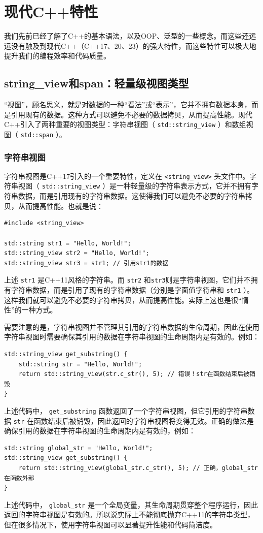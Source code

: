 \chapter{现代C++特性}

我们先前已经了解了C++的基本语法，以及OOP、泛型的一些概念。而这些还远远没有触及到现代C++（C++17、20、23）的强大特性，而这些特性可以极大地提升我们的编程效率和代码质量。

\section{string\_view和span：轻量级视图类型}

“视图”，顾名思义，就是对数据的一种“看法”或“表示”，它并不拥有数据本身，而是引用现有的数据。这种方式可以避免不必要的数据拷贝，从而提高性能。现代C++引入了两种重要的视图类型：字符串视图（ \verb|std::string_view| ）和数组视图（ \verb|std::span| ）。

\subsection{字符串视图}

字符串视图是C++17引入的一个重要特性，定义在 \verb|<string_view>| 头文件中。字符串视图（ \verb|std::string_view| ）是一种轻量级的字符串表示方式，它并不拥有字符串数据，而是引用现有的字符串数据。这使得我们可以避免不必要的字符串拷贝，从而提高性能。也就是说：

\begin{verbatim}
#include <string_view>

std::string str1 = "Hello, World!";
std::string_view str2 = "Hello, World!";
std::string_view str3 = str1; // 引用str1的数据
\end{verbatim}
上述 \verb|str1| 是C++11风格的字符串。而 \verb|str2| 和\verb|str3|则是字符串视图，它们并不拥有字符串数据，而是引用了现有的字符串数据（分别是字面值字符串和 \verb|str1| ）。这样我们就可以避免不必要的字符串拷贝，从而提高性能。实际上这也是很“惰性”的一种方式。

需要注意的是，字符串视图并不管理其引用的字符串数据的生命周期，因此在使用字符串视图时需要确保其引用的数据在字符串视图的生命周期内是有效的。例如：
\begin{verbatim}
std::string_view get_substring() {
    std::string str = "Hello, World!";
    return std::string_view(str.c_str(), 5); // 错误！str在函数结束后被销毁
}
\end{verbatim}
上述代码中， \verb|get_substring| 函数返回了一个字符串视图，但它引用的字符串数据 \verb|str| 在函数结束后被销毁，因此返回的字符串视图将变得无效。正确的做法是确保引用的数据在字符串视图的生命周期内是有效的，例如：
\begin{verbatim}
std::string global_str = "Hello, World!";
std::string_view get_substring() {
    return std::string_view(global_str.c_str(), 5); // 正确，global_str在函数外部
}
\end{verbatim}
上述代码中， \verb|global_str| 是一个全局变量，其生命周期贯穿整个程序运行，因此返回的字符串视图是有效的。所以说实际上不能彻底抛弃C++11的字符串类型，但在很多情况下，使用字符串视图可以显著提升性能和代码简洁度。

